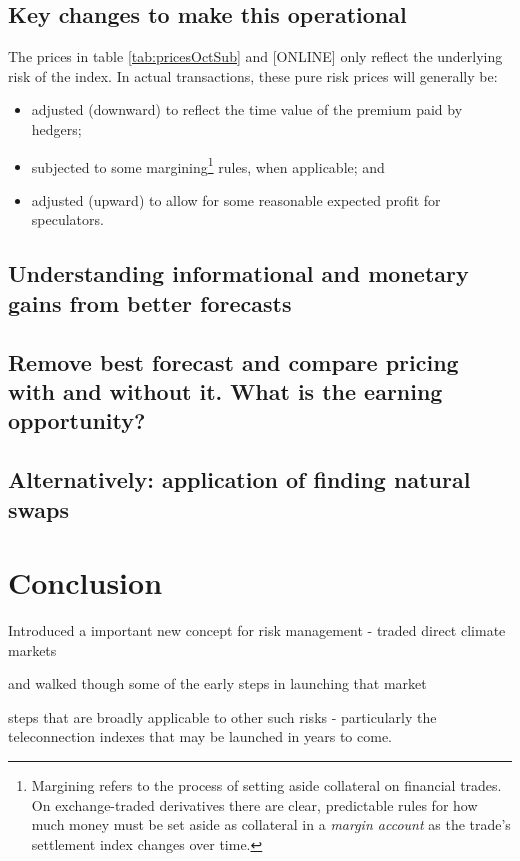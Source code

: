 \documentclass[authoryear]{article}
\begin{document}
\subsection{Key changes to make this operational}
The prices in table \ref{tab:pricesOctSub} and [ONLINE] only reflect the underlying risk of the index. In actual transactions, these pure risk prices will generally be:
\begin{itemize}
\item adjusted (downward) to reflect the time value of the premium paid by hedgers;
\item subjected to some margining\footnote{Margining refers to the process of setting aside collateral on financial trades. On exchange-traded derivatives there are clear, predictable rules for how much money must be set aside as collateral in a \emph{margin account} as the trade's settlement index changes over time.} rules, when applicable; and
\item adjusted (upward) to allow for some reasonable expected profit for speculators.
\end{itemize}

\subsection{Understanding informational and monetary gains from better forecasts}

\subsection{Remove best forecast and compare pricing with and without it. What is the earning opportunity?}

\subsection{Alternatively: application of finding natural swaps}







\section{Conclusion}
Introduced a important new concept for risk management - traded direct climate markets

and walked though some of the early steps in launching that market

steps that are broadly applicable to other such risks - particularly the teleconnection indexes that may be launched in years to come.
\end{document}
